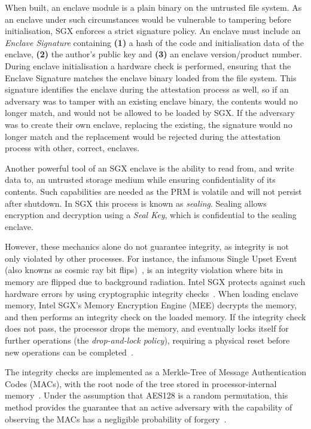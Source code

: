 \documentclass{article}
\begin{document}
			When built, an enclave module is a plain binary on the untrusted file system.
			As an enclave under such circumstances would be vulnerable to tampering before initialisation, SGX enforces a strict signature policy.
			An enclave must include an \textit{Enclave Signature} containing \textbf{(1)} a hash of the code and initialisation data of the enclave, \textbf{(2)} the author's public key and \textbf{(3)} an enclave version/product number.
			During enclave initialisation a hardware check is performed, ensuring that the Enclave Signature matches the enclave binary loaded from the file system.
			This signature identifies the enclave during the attestation process as well, so if an adversary was to tamper with an existing enclave binary, the contents would no longer match, and would not be allowed to be loaded by SGX.
			If the adversary was to create their own enclave, replacing the existing, the signature would no longer match and the replacement would be rejected during the attestation process with other, correct, enclaves.

			Another powerful tool of an SGX enclave is the ability to read from, and write data to, an untrusted storage medium while ensuring confidentiality of its contents.
			Such capabilities are needed as the PRM is volatile and will not persist after shutdown.
			In SGX this process is known as \textit{sealing}.
			Sealing allows encryption and decryption using a \textit{Seal Key}, which is confidential to the sealing enclave.

			However, these mechanics alone do not guarantee integrity, as integrity is not only violated by other processes.
			For instance, the infamous Single Upset Event (also knowns as cosmic ray bit flips)~\cite{normand_single_1996}, is an integrity violation where bits in memory are flipped due to background radiation.
			Intel SGX protects against such hardware errors by using cryptographic integrity checks~\cite{gueron_memory_2016}.
			When loading enclave memory, Intel SGX's Memory Encryption Engine (MEE) decrypts the memory, and then performs an integrity check on the loaded memory.
			If the integrity check does not pass, the processor drops the memory, and eventually locks itself for further operations (the \textit{drop-and-lock policy}), requiring a physical reset before new operations can be completed~\cite{jang_sgx-bomb_2017}.

			The integrity checks are implemented as a Merkle-Tree of Message Authentication Codes (MACs), with the root node of the tree stored in processor-internal memory~\cite{jang_sgx-bomb_2017}.
			Under the assumption that AES128 is a random permutation, this method provides the guarantee that an active adversary with the capability of observing the MACs has a negligible probability of forgery~\cite{gueron_memory_2016}.
\end{document}
